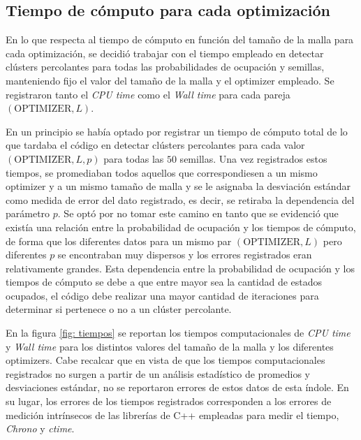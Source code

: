 \documentclass[%
 reprint,
 amsmath,amssymb,
 aps,
]{revtex4-2}
\begin{document}
\subsection{Tiempo de cómputo para cada optimización}

En lo que respecta al tiempo de cómputo en función del tamaño de la malla para cada optimización, se decidió trabajar con el tiempo empleado en detectar clústers percolantes para todas las probabilidades de ocupación y semillas, manteniendo fijo el valor del tamaño de la malla y el optimizer empleado. Se registraron tanto el \textit{CPU time} como el \textit{Wall time} para cada pareja $(\mathrm{OPTIMIZER}, L)$. 
\vspace{0.2 cm}

En un principio se había optado por registrar un tiempo de cómputo total de lo que tardaba el código en detectar clústers percolantes para cada valor $(\mathrm{OPTIMIZER}, L, p)$ para todas las $50$ semillas. Una vez registrados estos tiempos, se promediaban todos aquellos que correspondiesen a un mismo optimizer y a un mismo tamaño de malla y se le asignaba la desviación estándar como medida de error del dato registrado, es decir, se retiraba la dependencia del parámetro $p$. Se optó por no tomar este camino en tanto que se evidenció que existía una relación entre la probabilidad de ocupación y los tiempos de cómputo, de forma que los diferentes datos para un mismo par $(\mathrm{OPTIMIZER}, L)$ pero diferentes $p$ se encontraban muy dispersos y los errores registrados eran relativamente grandes. Esta dependencia entre la probabilidad de ocupación y los tiempos de cómputo se debe a que entre mayor sea la cantidad de estados ocupados, el código debe realizar una mayor cantidad de iteraciones para determinar si pertenece o no a un clúster percolante.
\vspace{0.2 cm}

En la figura \ref{fig: tiempos} se reportan los tiempos computacionales de \textit{CPU time} y \textit{Wall time} para los distintos valores del tamaño de la malla y los diferentes optimizers. Cabe recalcar que en vista de que los tiempos computacionales registrados no surgen a partir de un análisis estadístico de promedios y desviaciones estándar, no se reportaron errores de estos datos de esta índole. En su lugar, los errores de los tiempos registrados corresponden a los errores de medición intrínsecos de las librerías de C++ empleadas para medir el tiempo, \textit{Chrono} y \textit{ctime}.
\end{document}
